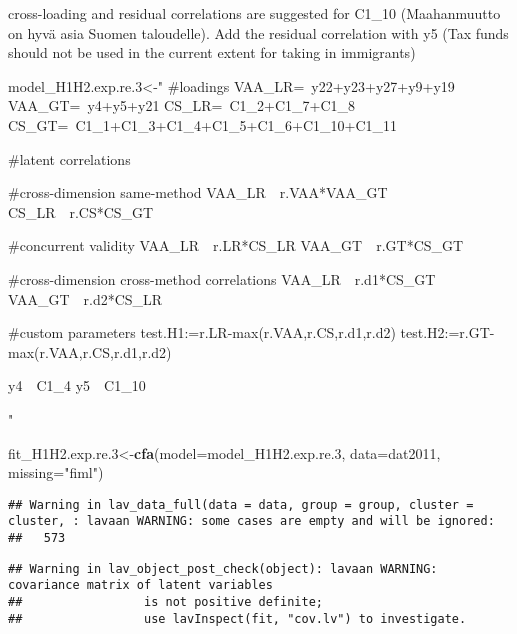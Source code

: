 \documentclass[
]{article}
\newenvironment{Shaded}{\begin{snugshade}}{\end{snugshade}}
\newcommand{\DataTypeTok}[1]{\textcolor[rgb]{0.13,0.29,0.53}{#1}}
\newcommand{\FloatTok}[1]{\textcolor[rgb]{0.00,0.00,0.81}{#1}}
\newcommand{\KeywordTok}[1]{\textcolor[rgb]{0.13,0.29,0.53}{\textbf{#1}}}
\newcommand{\NormalTok}[1]{#1}
\newcommand{\StringTok}[1]{\textcolor[rgb]{0.31,0.60,0.02}{#1}}
\begin{document}
cross-loading and residual correlations are suggested for C1\_10
(Maahanmuutto on hyvä asia Suomen taloudelle). Add the residual
correlation with y5 (Tax funds should not be used in the current extent
for taking in immigrants)

\begin{Shaded}
\begin{Highlighting}[]
\NormalTok{model_H1H2.exp.re}\FloatTok{.3}\NormalTok{<-}\StringTok{"}
\StringTok{#loadings}
\StringTok{VAA_LR=~y22+y23+y27+y9+y19}
\StringTok{VAA_GT=~y4+y5+y21}
\StringTok{CS_LR=~C1_2+C1_7+C1_8}
\StringTok{CS_GT=~C1_1+C1_3+C1_4+C1_5+C1_6+C1_10+C1_11}

\StringTok{#latent correlations}

\StringTok{#cross-dimension same-method}
\StringTok{VAA_LR~~r.VAA*VAA_GT}
\StringTok{CS_LR~~r.CS*CS_GT}

\StringTok{#concurrent validity}
\StringTok{VAA_LR~~r.LR*CS_LR}
\StringTok{VAA_GT~~r.GT*CS_GT}

\StringTok{#cross-dimension cross-method correlations}
\StringTok{VAA_LR~~r.d1*CS_GT}
\StringTok{VAA_GT~~r.d2*CS_LR}

\StringTok{#custom parameters}
\StringTok{test.H1:=r.LR-max(r.VAA,r.CS,r.d1,r.d2)}
\StringTok{test.H2:=r.GT-max(r.VAA,r.CS,r.d1,r.d2)}


\StringTok{y4~~C1_4}
\StringTok{y5~~C1_10   }

\StringTok{"}
\end{Highlighting}
\end{Shaded}

\begin{Shaded}
\begin{Highlighting}[]
\NormalTok{fit_H1H2.exp.re}\FloatTok{.3}\NormalTok{<-}\KeywordTok{cfa}\NormalTok{(}\DataTypeTok{model=}\NormalTok{model_H1H2.exp.re}\FloatTok{.3}\NormalTok{,}
              \DataTypeTok{data=}\NormalTok{dat2011,}
              \DataTypeTok{missing=}\StringTok{"fiml"}\NormalTok{)}
\end{Highlighting}
\end{Shaded}

\begin{verbatim}
## Warning in lav_data_full(data = data, group = group, cluster = cluster, : lavaan WARNING: some cases are empty and will be ignored:
##   573
\end{verbatim}

\begin{verbatim}
## Warning in lav_object_post_check(object): lavaan WARNING: covariance matrix of latent variables
##                 is not positive definite;
##                 use lavInspect(fit, "cov.lv") to investigate.
\end{verbatim}
\end{document}

